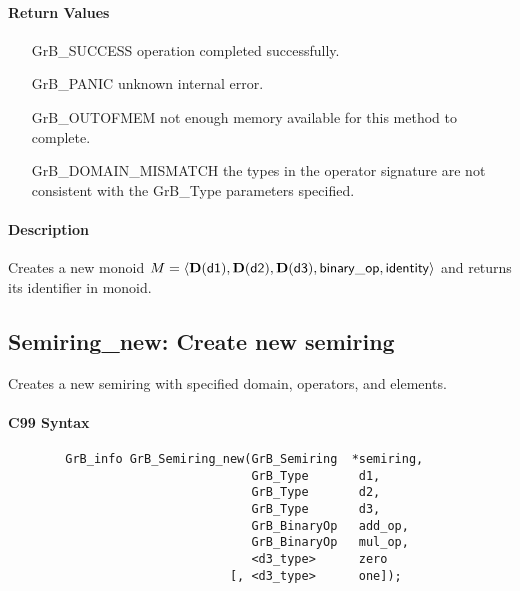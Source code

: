 \paragraph{Return Values}

\begin{itemize}[leftmargin=2.1in]
\item[{\sf GrB\_SUCCESS}]           operation completed successfully.
\item[{\sf GrB\_PANIC}]             unknown internal error.
\item[{\sf GrB\_OUTOFMEM}]          not enough memory available for this method to complete.
\item[{\sf GrB\_DOMAIN\_MISMATCH}]  the types in the operator signature are not   
                                    consistent with the {\sf GrB\_Type} parameters specified.
\end{itemize}

\paragraph{Description}

Creates a new monoid $M = \langle \bold{D}({\sf d1}), \bold{D}({\sf d2}), 
\bold{D}({\sf d3}), {\sf binary\_op}, {\sf identity} \rangle$ and
returns its identifier in {\sf monoid}.


\subsection{{\sf Semiring\_new}: Create new semiring}

Creates a new semiring with specified domain, operators, and elements.

\paragraph{C99 Syntax}

\begin{verbatim}
        GrB_info GrB_Semiring_new(GrB_Semiring  *semiring,
                                  GrB_Type       d1,
                                  GrB_Type       d2,
                                  GrB_Type       d3,
                                  GrB_BinaryOp   add_op,
                                  GrB_BinaryOp   mul_op,
                                  <d3_type>      zero
                               [, <d3_type>      one]);
\end{verbatim}

